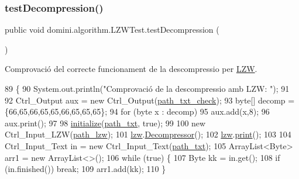 \subsubsection{\texorpdfstring{test\+Decompression()}{testDecompression()}}
{\footnotesize\ttfamily public void domini.\+algorithm.\+L\+Z\+W\+Test.\+test\+Decompression (\begin{DoxyParamCaption}{ }\end{DoxyParamCaption})\hspace{0.3cm}{\ttfamily [inline]}}



Comprovació del correcte funcionament de la descompressio per \hyperlink{classdomini_1_1algorithm_1_1LZW}{L\+ZW}. 


\begin{DoxyCode}
89                                     \{
90         System.out.println(\textcolor{stringliteral}{"Comprovació de la descompressio amb LZW: "});
91         
92         Ctrl\_Output aux = \textcolor{keyword}{new} Ctrl\_Output(\hyperlink{classdomini_1_1algorithm_1_1LZWTest_add9dbf2d86413bf9f7bcdd23b268c288}{path\_txt\_check});
93         byte[] decomp = \{66,65,66,65,65,66,65,65,65\};
94         \textcolor{keywordflow}{for} (byte x : decomp) 
95             aux.add(x,8);
96         aux.print();
97         
98         \hyperlink{classdomini_1_1algorithm_1_1LZWTest_acf4cac88aafa2144dc8ce3a80453fa90}{initialize}(\hyperlink{classdomini_1_1algorithm_1_1LZWTest_a4194ade234060b69729a0380ff4ae33d}{path\_txt}, \textcolor{keyword}{true});
99 
100         \textcolor{keyword}{new} Ctrl\_Input\_LZW(\hyperlink{classdomini_1_1algorithm_1_1LZWTest_af5091e6df88845c585e92165f2fae2dc}{path\_lzw});
101         \hyperlink{classdomini_1_1algorithm_1_1LZWTest_a591c1bb9b927631d0e60a2853e502d20}{lzw}.\hyperlink{classdomini_1_1algorithm_1_1LZW_a6a5d986396443691861ac9ba41b2dd33}{Decompressor}();
102         \hyperlink{classdomini_1_1algorithm_1_1LZWTest_a591c1bb9b927631d0e60a2853e502d20}{lzw}.\hyperlink{classdomini_1_1algorithm_1_1Algorithm_a5546f991f9d71d012d6ded5f2d4181cb}{print}();
103 
104         Ctrl\_Input\_Text in = \textcolor{keyword}{new} Ctrl\_Input\_Text(\hyperlink{classdomini_1_1algorithm_1_1LZWTest_a4194ade234060b69729a0380ff4ae33d}{path\_txt});
105         ArrayList<Byte> arr1 = \textcolor{keyword}{new} ArrayList<>();
106         \textcolor{keywordflow}{while} (\textcolor{keyword}{true}) \{
107             Byte kk = in.get();
108             \textcolor{keywordflow}{if} (in.finished()) \textcolor{keywordflow}{break};
109             arr1.add(kk);
110         \}

\end{DoxyCode}
